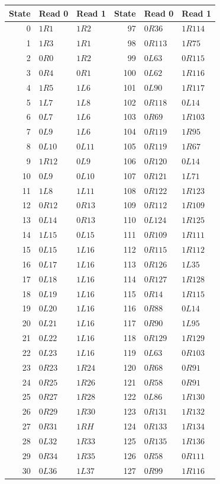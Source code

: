 \begin{longtable}{rll@{\hspace{1.6cm}}rll}
\toprule State & Read 0 & Read 1 & State & Read 0 & Read 1\\\midrule
\endhead
0&$1R1$&$1R2$&97&$0R36$&$1R114$\\
1&$1R3$&$1R1$&98&$0R113$&$1R75$\\
2&$0R0$&$1R2$&99&$0L63$&$0R115$\\
3&$0R4$&$0R1$&100&$0L62$&$1R116$\\
4&$1R5$&$1L6$&101&$0L90$&$1R117$\\
5&$1L7$&$1L8$&102&$0R118$&$0L14$\\
6&$0L7$&$1L6$&103&$0R69$&$1R103$\\
7&$0L9$&$1L6$&104&$0R119$&$1R95$\\
8&$0L10$&$0L11$&105&$0R119$&$1R67$\\
9&$1R12$&$0L9$&106&$0R120$&$0L14$\\
10&$0L9$&$0L10$&107&$0R121$&$1L71$\\
11&$1L8$&$1L11$&108&$0R122$&$1R123$\\
12&$0R12$&$0R13$&109&$0R112$&$1R109$\\
13&$0L14$&$0R13$&110&$0L124$&$1R125$\\
14&$1L15$&$0L15$&111&$0R109$&$1R111$\\
15&$0L15$&$1L16$&112&$0R115$&$1R112$\\
16&$0L17$&$1L16$&113&$0R126$&$1L35$\\
17&$0L18$&$1L16$&114&$0R127$&$1R128$\\
18&$0L19$&$1L16$&115&$0R14$&$1R115$\\
19&$0L20$&$1L16$&116&$0R88$&$0L14$\\
20&$0L21$&$1L16$&117&$0R90$&$1L95$\\
21&$0L22$&$1L16$&118&$0R129$&$1R129$\\
22&$0L23$&$1L16$&119&$0L63$&$0R103$\\
23&$0R23$&$1R24$&120&$0R68$&$0R91$\\
24&$0R25$&$1R26$&121&$0R58$&$0R91$\\
25&$0R27$&$1R28$&122&$0L86$&$1R130$\\
26&$0R29$&$1R30$&123&$0R131$&$1R132$\\
27&$0R31$&$1RH$&124&$0R133$&$1R134$\\
28&$0L32$&$1R33$&125&$0R135$&$1R136$\\
29&$0R34$&$1R35$&126&$0R58$&$0R111$\\
30&$0L36$&$1L37$&127&$0R99$&$1R116$\\

\end{longtable}
